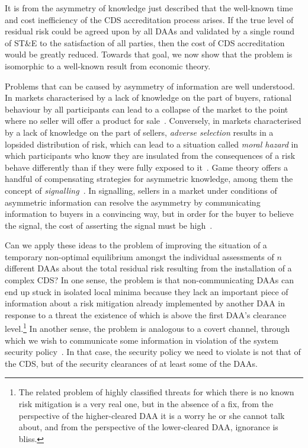 \documentclass{llncs}
\begin{document}
It is from the asymmetry of knowledge
just described that the well-known time and cost inefficiency of the CDS
accreditation process arises.
If the true level of residual risk could be agreed upon by all DAAs and
validated by a single round of ST\&E to the satisfaction of all parties,
then the cost of CDS accreditation would be greatly reduced.  Towards that goal,
we now show that the problem is isomorphic to a well-known result from economic
theory.

Problems that can be caused by asymmetry of information are well
understood.
In markets characterised by a lack of knowledge on the part of
buyers, rational behaviour by all participants can lead to a collapse
of the market to the point where no seller will offer a product for
sale~\cite{Akerlof1970}.
Conversely, in markets characterised by a lack of knowledge on the
part of sellers, \emph{adverse selection} results in a lopsided distribution
of risk, which can lead to a situation called \emph{moral hazard} in which
participants who know they are insulated from the consequences of a
risk behave differently than if they were fully exposed to it~\cite{Crosby1905}.
Game theory offers a handful of compensating strategies for asymmetric
knowledge, among them the concept
of \emph{signalling}~\cite{Spence1973,Stigler1961}.  In signalling,
sellers in a market under conditions of asymmetric information
can resolve the asymmetry by communicating information to buyers in a
convincing way, but in order for the buyer to believe the signal, the cost
of asserting the signal must be high~\cite{Spence1973}.

Can we apply these ideas to the problem of improving the situation of a
temporary non-optimal equilibrium amongst the individual assessments
of $n$ different DAAs about the total residual risk resulting from the
installation of a complex CDS?  In one sense, the problem is that
non-communicating DAAs can end up stuck in isolated local minima
because they lack an important piece of information
about a risk mitigation
already implemented by another DAA in response to a threat the existence
of which is above the first DAA's clearance level.\footnote{The related problem
of highly classified
threats for which there is no known risk mitigation is a very real one,
but in the absence of a fix, from the perspective of the higher-cleared
DAA it is a worry he or she cannot talk about, and from the perspective of the
lower-cleared DAA, ignorance is bliss.}  In another sense, the problem
is analogous to a covert channel, through which we wish to communicate
some information in violation of the system security policy~\cite{NCSC-TG-030}.
In that case, the security policy we need to violate is not that of the CDS, but of
the security clearances of at least some of the DAAs.
\end{document}

